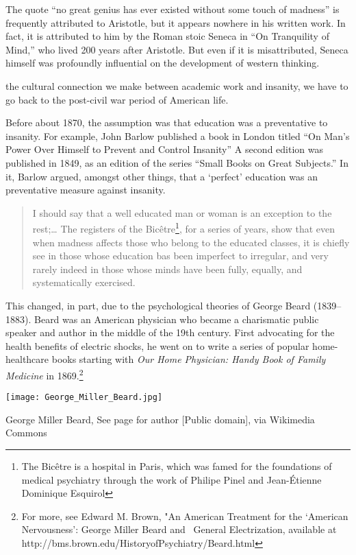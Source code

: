 The quote ``no great genius has ever existed without some touch of madness'' is frequently attributed to Aristotle, but it appears nowhere in his written work. In fact, it is attributed to him by the Roman stoic Seneca in ``On Tranquility of Mind,'' who lived 200 years after Aristotle. But even if it is misattributed, Seneca himself was profoundly influential on the development of western thinking.

the cultural connection we make between academic work and insanity, we have to go back to the post-civil war period of American life.

Before about 1870, the assumption was that education was a preventative to insanity. For example, John Barlow published a book in London titled ``On Man's Power Over Himself to Prevent and Control Insanity'' A second edition was published in 1849, as an edition of the series ``Small Books on Great Subjects.'' In it, Barlow argued, amongst other things, that a `perfect' education was an preventative measure against insanity. 

\begin{quote}

I should say that a well educated man or woman is an exception to the rest;{\ldots} The registers of the Bicêtre\footnote{The Bicêtre is a hospital in Paris, which was famed for the foundations of medical psychiatry through the work of Philipe Pinel and Jean-Étienne Dominique Esquirol}, for a series of years, show that even when madness affects those who belong to the educated classes, it is chiefly see in those whose education bas been imperfect to irregular, and very rarely indeed in those whose minds have been fully, equally, and systematically exercised. ~\citep[p. 59--60]{Barlow:1849tp}
\end{quote}

This changed, in part, due to the psychological theories of George Beard (1839--1883). Beard was an American physician who became a charismatic public speaker and author in the middle of the 19th century. First advocating for the health benefits of electric shocks, he went on to write a series of popular home-healthcare books starting with \emph{Our Home Physician: Handy Book of Family Medicine} in 1869.\footnote{For more, see Edward M. Brown, "An American Treatment for the `American Nervousness': George Miller Beard and  General Electrization, available at http:\slash \slash bms.brown.edu\slash HistoryofPsychiatry\slash Beard.html} \begin{marginfigure}\texttt{[image: George\_Miller\_Beard.jpg]}\caption{George Miller Beard, See page for author [Public domain], via Wikimedia Commons}\label{fig:beard}\end{marginfigure}

